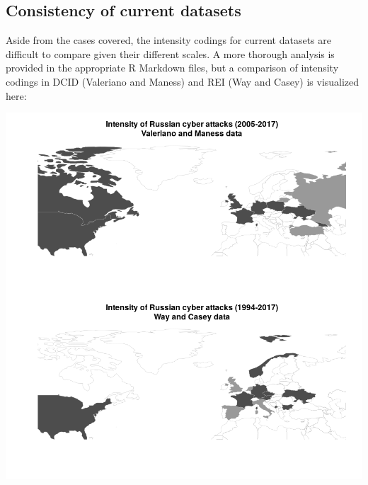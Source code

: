 \documentclass[
]{article}
\begin{document}
\hypertarget{consistency-of-current-datasets}{%
\subsection{Consistency of current
datasets}\label{consistency-of-current-datasets}}

Aside from the cases covered, the intensity codings for current datasets
are difficult to compare given their different scales. A more thorough
analysis is provided in the appropriate R Markdown files, but a
comparison of intensity codings in DCID (Valeriano and Maness) and REI
(Way and Casey) is visualized here:

\includegraphics{../paper/figures/map_prior-data.png}
\end{document}
